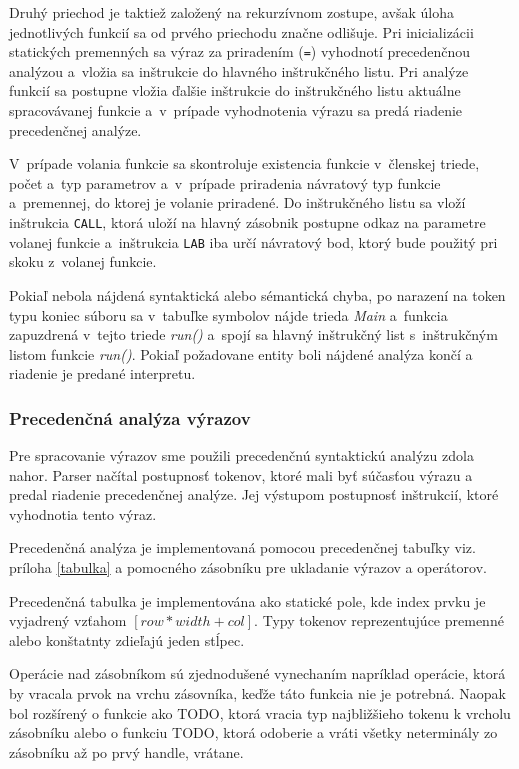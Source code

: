 \documentclass[11pt,a4paper]{article}
\begin{document}
	Druhý priechod je taktiež založený na rekurzívnom zostupe, avšak úloha
	jednotlivých funkcií sa od prvého priechodu značne odlišuje.
	Pri inicializácii statických premenných sa výraz za priradením (\texttt{=})
	vyhodnotí precedenčnou analýzou a~vložia sa inštrukcie do hlavného
	inštrukčného listu. Pri analýze funkcií sa postupne vložia ďalšie inštrukcie
	do inštrukčného listu aktuálne spracovávanej funkcie a~v~prípade vyhodnotenia
	výrazu  sa predá riadenie precedenčnej analýze.

	V~prípade volania funkcie sa skontroluje existencia funkcie v~členskej
	triede, počet a~typ parametrov a~v~prípade priradenia  návratový typ
	funkcie a~premennej, do ktorej je volanie priradené. Do inštrukčného
	listu sa vloží inštrukcia \texttt{CALL}, ktorá uloží na hlavný zásobnik
	postupne odkaz na parametre volanej funkcie a~inštrukcia \texttt{LAB}
	iba určí návratový bod, ktorý bude použitý pri skoku z~volanej funkcie.

	Pokiaľ nebola nájdená syntaktická alebo sémantická chyba, po narazení na
	token typu koniec súboru sa v~tabuľke symbolov nájde trieda \emph{Main}
	a~funkcia zapuzdrená v~tejto triede \emph{run()} a~spojí sa hlavný inštrukčný
	list s~inštrukčným listom funkcie \emph{run()}. Pokiaľ požadovane entity
	boli nájdené analýza končí a riadenie je predané interpretu.

	\subsubsection{Precedenčná analýza výrazov}
	\label{precedencna analyza}

	Pre spracovanie výrazov sme použili precedenčnú syntaktickú analýzu zdola nahor.
	Parser načítal postupnosť tokenov, ktoré mali byť súčasťou výrazu a predal
	riadenie precedenčnej analýze. Jej výstupom postupnosť inštrukcií, ktoré vyhodnotia tento výraz.

	Precedenčná analýza je implementovaná pomocou precedenčnej tabuľky viz.
	príloha \ref{tabulka} a pomocného zásobníku pre ukladanie výrazov a operátorov.

	Precedenčná tabulka je implementována ako statické pole, kde index prvku je vyjadrený vzťahom $[row * width + col]$.
	Typy tokenov reprezentujúce premenné alebo konštatnty zdieľajú jeden stĺpec.

	Operácie nad zásobníkom sú zjednodušené vynechaním napríklad operácie, ktorá by vracala prvok na vrchu zásovníka, keďže táto funkcia nie je potrebná. Naopak bol rozšírený o funkcie ako TODO, ktorá vracia typ najbližšieho tokenu k vrcholu zásobníku alebo o funkciu TODO, ktorá odoberie a vráti všetky neterminály zo zásobníku až po prvý handle, vrátane.
\end{document}
